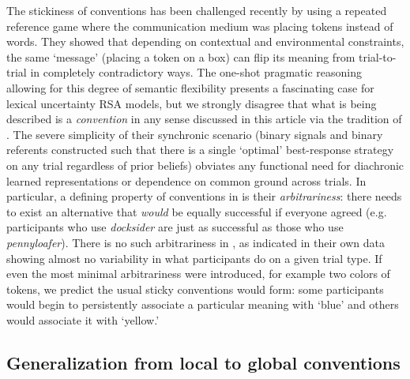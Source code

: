 The stickiness of conventions has been challenged recently by  using a repeated reference game where the communication medium was placing tokens instead of words. They showed that depending on contextual and environmental constraints, the same `message' (placing a token on a box) can flip its meaning from trial-to-trial in completely contradictory ways. The one-shot pragmatic reasoning allowing for this degree of semantic flexibility presents a fascinating case for lexical uncertainty RSA models, but we strongly disagree that what is being described is a \emph{convention} in any sense discussed in this article via the tradition of . The severe simplicity of their synchronic scenario (binary signals and binary referents constructed such that there is a single `optimal' best-response strategy on any trial regardless of prior beliefs) obviates any functional need for diachronic learned representations or dependence on common ground across trials. In particular, a defining property of conventions in is their \emph{arbitrariness}: there needs to exist an alternative that \emph{would} be equally successful if everyone agreed (e.g. participants who use \emph{docksider} are just as successful as those who use  \emph{pennyloafer}). There is no such arbitrariness in , as indicated in their own data showing almost no variability in what participants do on a given trial type. If even the most minimal arbitrariness were introduced, for example two colors of tokens, we predict the usual sticky conventions would form: some participants would begin to persistently associate a particular meaning with `blue' and others would associate it with `yellow.' %

%
%

\subsection{Generalization from local to global conventions}

